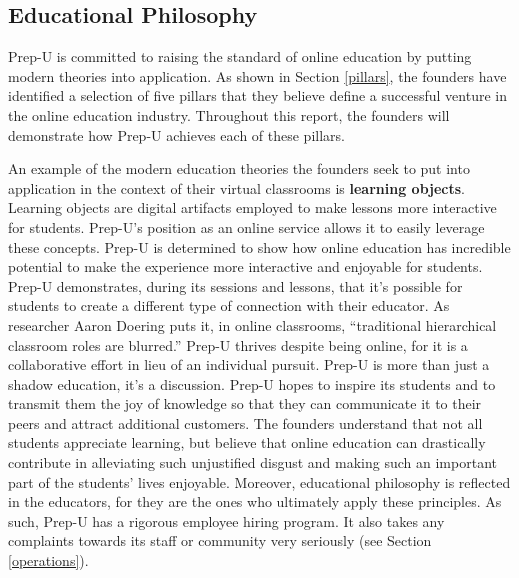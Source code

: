 \documentclass{business}
\begin{document}
    \subsection{Educational Philosophy}\label{educational-philosophy}
    Prep-U is committed to raising the standard of online education by putting modern theories into application. As shown in Section \ref{pillars}, the founders have identified a selection of five pillars that they believe define a successful venture in the online education industry. Throughout this report, the founders will demonstrate how Prep-U achieves each of these pillars. \par
    An example of the modern education theories the founders seek to put into application in the context of their virtual classrooms is \textbf{learning objects}. Learning objects are digital artifacts employed to make lessons more interactive for students. Prep-U’s position as an online service allows it to easily leverage these concepts. \cite{Vanessa} Prep-U is determined to show how online education has incredible potential to make the experience more interactive and enjoyable for students. Prep-U demonstrates, during its sessions and lessons, that it’s possible for students to create a different type of connection with their educator. As researcher Aaron Doering puts it, in online classrooms, ``traditional hierarchical classroom roles are blurred.'' \cite{Doering2007} Prep-U thrives despite being online, for it is a collaborative effort in lieu of an individual pursuit. Prep-U is more than just a shadow education, it’s a discussion. Prep-U hopes to inspire its students and to transmit them the joy of knowledge so that they can communicate it to their peers and attract additional customers. The founders understand that not all students appreciate learning, but believe that online education can drastically contribute in alleviating such unjustified disgust and making such an important part of the students’ lives enjoyable. Moreover, educational philosophy is reflected in the educators, for they are the ones who ultimately apply these principles. As such, Prep-U has a rigorous employee hiring program. It also takes any complaints towards its staff or community very seriously (see Section \ref{operations}).
\end{document}
